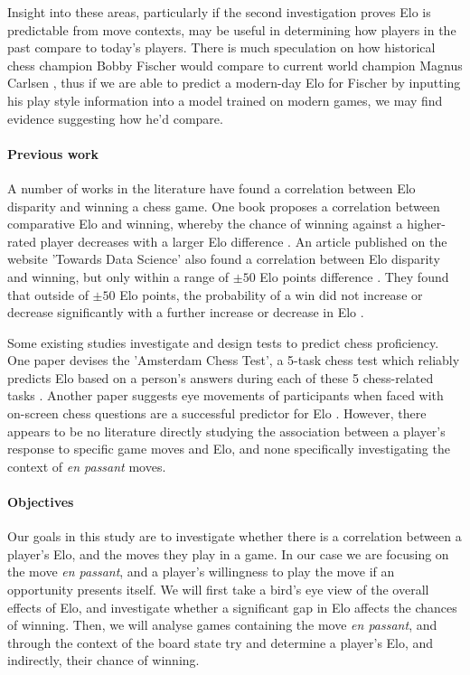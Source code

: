 \documentclass[10pt,a4paper]{article}
\begin{document}
\begin{multicols}{2}
Insight into these areas, particularly if the second investigation proves Elo is predictable from move contexts, may be useful in determining how players in the past compare to today's players. There is much speculation on how historical chess champion Bobby Fischer would compare to current world champion Magnus Carlsen \cite{BobbyFischerVsMagnusCarlsen}, thus if we are able to predict a modern-day Elo for Fischer by inputting his play style information into a model trained on modern games, we may find evidence suggesting how he'd compare.

\paragraph{Previous work}

A number of works in the literature have found a correlation between Elo disparity and winning a chess game. One book proposes a correlation between comparative Elo and winning, whereby the chance of winning against a higher-rated player decreases with a larger Elo difference \cite{PsychologyOfChessSkill}. An article published on the website 'Towards Data Science' also found a correlation between Elo disparity and winning, but only within a range of $\pm 50$ Elo points difference \cite{HowMuchDoesEloMatter}. They found that outside of $\pm 50$ Elo points, the probability of a win did not increase or decrease significantly with a further increase or decrease in Elo \cite{HowMuchDoesEloMatter}. \newline

Some existing studies investigate and design tests to predict chess proficiency. One paper devises the 'Amsterdam Chess Test', a 5-task chess test which reliably predicts Elo based on a person's answers during each of these 5 chess-related tasks \cite{PsychometricAnalysisChessExpertise}. Another paper suggests eye movements of participants when faced with on-screen chess questions are a successful predictor for Elo \cite{VisualPerceptionRankingChess}. However, there appears to be no literature directly studying the association between a player's response to specific game moves and Elo, and none specifically investigating the context of \textit{en passant} moves.


\paragraph{Objectives}

Our goals in this study are to investigate whether there is a correlation between a player's Elo, and the moves they play in a game. In our case we are focusing on the move \textit{en passant}, and a player's willingness to play the move if an opportunity presents itself. We will first take a bird's eye view of the overall effects of Elo, and investigate whether a significant gap in Elo affects the chances of winning. Then, we will analyse games containing the move \textit{en passant}, and through the context of the board state try and determine a player's Elo, and indirectly, their chance of winning.


\end{multicols}
\end{document}
